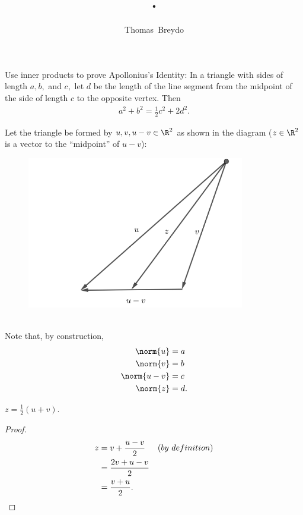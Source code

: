 \documentclass{amsart}
\title{\pagenum.\probnum}
\author{Thomas\ Breydo}
\begin{document}
\maketitle

\begin{problem*}
Use inner products to prove Apollonius's Identity: In a triangle with
sides of length $a,b,$ and $c,$ let $d$ be the length of the line segment
from the midpoint of the side of length $c$ to the opposite vertex. Then
\begin{align*}
    a^2 + b^2 = \frac12 c^2 + 2d^2.
\end{align*}
\end{problem*}
\vspace{0.5in}

Let the triangle be formed by $u,v,u-v\in\R^2$ as shown in the diagram
($z\in\R^2$ is a vector to the ``midpoint'' of $u-v$):
\begin{figure}[h]
    \centering
    \includegraphics[width=0.85\textwidth]{179_31_triangle.png}
\end{figure}\\
Note that, by construction,
\begin{align*}
    \norm{u} &= a \\
    \norm{v} &= b \\
    \norm{u-v} &= c \\
    \norm{z} &= d.
\end{align*}

\begin{claim*}
    $z=\frac12(u+v).$
\end{claim*}
\begin{proof}
\begin{align*}
    z &= v + \frac{u-v}2 && (by\ definition)\\
      &= \frac{2v+u-v}2 \\
      &= \frac{v+u}2.\qedhere
\end{align*}
\end{proof}
\end{document}

